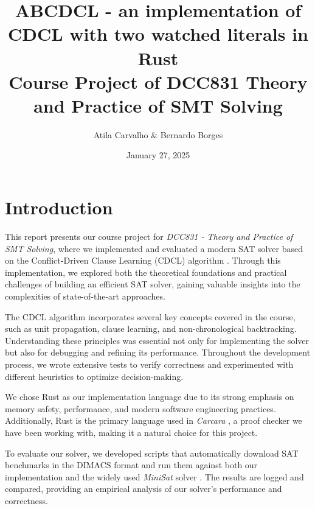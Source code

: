 \documentclass[a4paper,12pt]{article}
\title{ABCDCL - an implementation of CDCL with two watched literals in Rust\\
{\footnotesize Course Project of DCC831 Theory and Practice of SMT Solving}
}
\author{Atila Carvalho \& Bernardo Borges}
\date{January 27, 2025}
\begin{document}
\maketitle

\tableofcontents
\newpage

\section{Introduction}
\label{sec:introduction}

This report presents our course project for \textit{DCC831 - Theory and Practice of SMT Solving},
where we implemented and evaluated a modern SAT solver based on the Conflict-Driven Clause Learning
(CDCL) algorithm \cite{CdclAlgorithm}. Through this implementation, we explored both the theoretical
foundations and practical challenges of building an efficient SAT solver, gaining valuable insights
into the complexities of state-of-the-art approaches.

The CDCL algorithm incorporates several key concepts covered in the course, such as unit propagation,
clause learning, and non-chronological backtracking. Understanding these principles was essential not
only for implementing the solver but also for debugging and refining its performance. Throughout the
development process, we wrote extensive tests to verify correctness and experimented with different
heuristics to optimize decision-making.

We chose Rust \cite{RustLang} as our implementation language due to its strong emphasis on memory
safety, performance, and modern software engineering practices. Additionally, Rust is the primary
language used in \textit{Carcara} \cite{Carcara}, a proof checker we have been working with, making
it a natural choice for this project.

To evaluate our solver, we developed scripts that automatically download SAT benchmarks \cite{SatBenchmarks}
in the DIMACS format and run them against both our implementation and the widely used \textit{MiniSat}
solver \cite{Minisat}. The results are logged and compared, providing an empirical analysis of our
solver's performance and correctness.

\end{document}
